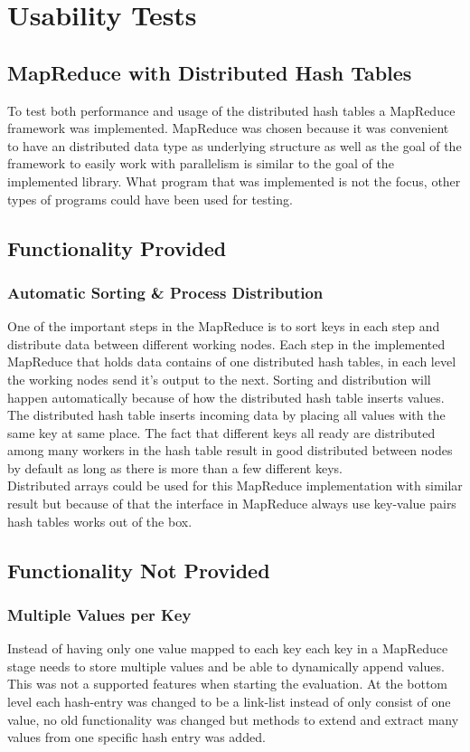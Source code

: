 \section{Usability Tests}
\subsection{MapReduce with Distributed Hash Tables}
To test both performance and usage of the distributed hash tables a MapReduce framework was implemented. MapReduce was chosen because it was convenient to have an distributed data type as underlying structure as well as the goal of the framework to easily work with parallelism is similar to the goal of the implemented library. What program that was implemented is not the focus, other types of programs could have been used for testing.

\subsection{Functionality Provided}
\subsubsection{Automatic Sorting \& Process Distribution}
One of the important steps in the MapReduce is to sort keys in each step and distribute data between different working nodes. Each step in the implemented MapReduce that holds data contains of one distributed hash tables, in each level the working nodes send it's output to the next. Sorting and distribution will happen automatically because of how the distributed hash table inserts values.\\ 

The distributed hash table inserts incoming data by placing all values with the same key at same place. The fact that different keys all ready are distributed among many workers in the hash table result in good distributed between nodes by default as long as there is more than a few different keys. \\

Distributed arrays could be used for this MapReduce implementation with similar result but because of that the interface in MapReduce always use key-value pairs hash tables works out of the box.

\subsection{Functionality Not Provided}
\subsubsection{Multiple Values per Key}
Instead of having only one value mapped to each key each key in a MapReduce stage needs to store multiple values and be able to dynamically append values. This was not a supported features when starting the evaluation. At the bottom level each hash-entry was changed to be a link-list instead of only consist of one value, no old functionality was changed but methods to extend and extract many values from one specific hash entry was added.

